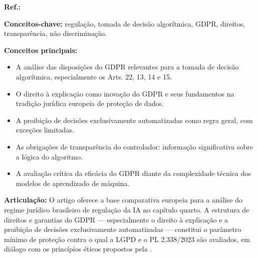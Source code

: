 \begin{fichamento}
    \textbf{Ref.:} \cite{Goodman2017EU}
    
    \textbf{Conceitos-chave:} regulação, tomada de decisão algorítmica, GDPR, direitos, transparência, não discriminação.
    
    \textbf{Conceitos principais:}
    \begin{itemize}
        \item A análise das disposições do GDPR relevantes para a tomada de decisão algorítmica, especialmente os Arts. 22, 13, 14 e 15.
        \item O direito à explicação como inovação do GDPR e seus fundamentos na tradição jurídica europeia de proteção de dados.
        \item A proibição de decisões exclusivamente automatizadas como regra geral, com exceções limitadas.
        \item As obrigações de transparência do controlador: informação significativa sobre a lógica do algoritmo.
        \item A avaliação crítica da eficácia do GDPR diante da complexidade técnica dos modelos de aprendizado de máquina.
    \end{itemize}
    
    \textbf{Articulação:} O artigo oferece a base comparativa europeia para a análise do regime jurídico brasileiro de regulação da IA no capítulo quarto. A estrutura de direitos e garantias do GDPR — especialmente o direito à explicação e a proibição de decisões exclusivamente automatizadas — constitui o parâmetro mínimo de proteção contra o qual a LGPD e o PL 2.338/2023 são avaliados, em diálogo com os princípios éticos propostos pela \MH{}.
\end{fichamento}

